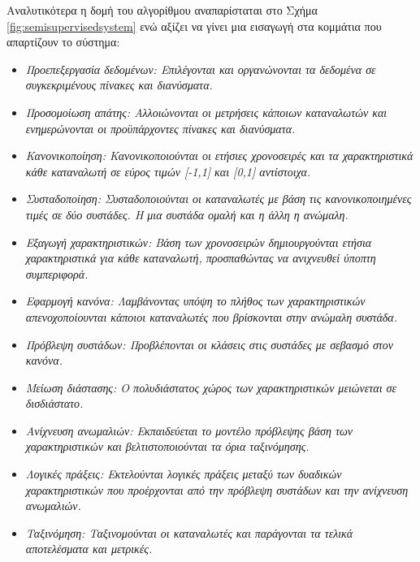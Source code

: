 Αναλυτικότερα η δομή του αλγορίθμου αναπαρίσταται στο Σχήμα \ref{fig:semisupervisedsystem} ενώ αξίζει να γίνει μια εισαγωγή στα κομμάτια που απαρτίζουν το σύστημα:
\begin{itemize}
\item \em{Προεπεξεργασία δεδομένων}: Επιλέγονται και οργανώνονται τα δεδομένα σε συγκεκριμένους πίνακες και διανύσματα.
\item \em{Προσομοίωση απάτης}: Αλλοιώνονται οι μετρήσεις κάποιων καταναλωτών και ενημερώνονται οι προϋπάρχοντες πίνακες και διανύσματα.
\item \em{Κανονικοποίηση}: Κανονικοποιούνται οι ετήσιες χρονοσειρές και τα χαρακτηριστικά κάθε καταναλωτή σε εύρος τιμών [-1,1] και [0,1] αντίστοιχα.
\item \em{Συσταδοποίηση}: Συσταδοποιούνται οι καταναλωτές με βάση τις κανονικοποιημένες τιμές σε δύο συστάδες. Η μια συστάδα ομαλή και η άλλη η ανώμαλη. 
\item \em{Εξαγωγή χαρακτηριστικών}: Βάση των χρονοσειρών δημιουργούνται ετήσια χαρακτηριστικά για κάθε καταναλωτή, προσπαθώντας να ανιχνευθεί ύποπτη συμπεριφορά.
\item \em{Εφαρμογή κανόνα}: Λαμβάνοντας υπόψη το πλήθος των χαρακτηριστικών απενοχοποίουνται κάποιοι καταναλωτές που βρίσκονται στην ανώμαλη συστάδα.
\item \em{Πρόβλεψη συστάδων}: Προβλέπονται οι κλάσεις στις συστάδες με σεβασμό στον κανόνα.
\item \em{Μείωση διάστασης}: Ο πολυδιάστατος χώρος των χαρακτηριστικών μειώνεται σε δισδιάστατο.
\item \em{Ανίχνευση ανωμαλιών}: Εκπαιδεύεται το μοντέλο πρόβλεψης βάση των χαρακτηριστικών και βελτιστοποιούνται τα όρια ταξινόμησης.
\item \em{Λογικές πράξεις}: Εκτελούνται λογικές πράξεις μεταξύ των δυαδικών χαρακτηριστικών που προέρχονται από την πρόβλεψη συστάδων και την ανίχνευση ανωμαλιών.
\item \em{Ταξινόμηση}: Ταξινομούνται οι καταναλωτές και παράγονται τα τελικά αποτελέσματα και μετρικές.
\end{itemize}

